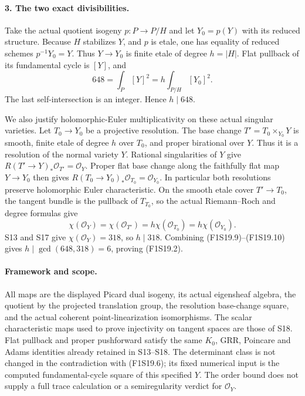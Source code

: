 \paragraph{3. The two exact divisibilities.}
Take the actual quotient isogeny $p:P\to P/H$ and let
$Y_0=p(Y)$ with its reduced structure. Because $H$ stabilizes
$Y$, and $p$ is etale, one has equality of reduced schemes
$p^{-1}Y_0=Y$. Thus $Y\to Y_0$ is finite etale of degree
$h=|H|$. Flat pullback of its fundamental cycle is $[Y]$, and
\[
          648=\int_P[Y]^2
                     =h\int_{P/H}[Y_0]^2.
 \tag{F1S19.9}
\]
The last self-intersection is an integer. Hence $h\mid648$.

We also justify holomorphic-Euler multiplicativity on these
actual singular varieties. Let $T_0\to Y_0$ be a projective
resolution. The base change $T'=T_0\times_{Y_0}Y$ is smooth,
finite etale of degree $h$ over $T_0$, and proper birational
over $Y$. Thus it is a resolution of the normal variety $Y$.
Rational singularities of $Y$ give
$R(T'\to Y)_*\mathcal O_{T'}=\mathcal O_Y$. Proper flat
base change along the faithfully flat map $Y\to Y_0$ then
gives $R(T_0\to Y_0)_*\mathcal O_{T_0}=\mathcal O_{Y_0}$.
In particular both resolutions preserve holomorphic Euler
characteristic. On the smooth etale cover $T'\to T_0$, the
tangent bundle is the pullback of $T_{T_0}$, so the actual
Riemann--Roch and degree formulas give
\[
 \chi(\mathcal O_Y)=\chi(\mathcal O_{T'})
     =h\chi(\mathcal O_{T_0})=h\chi(\mathcal O_{Y_0}).
 \tag{F1S19.10}
\]
S13 and S17 give $\chi(\mathcal O_Y)=318$, so $h\mid318$.
Combining (F1S19.9)--(F1S19.10) gives
$h\mid\gcd(648,318)=6$, proving (F1S19.2).

\paragraph{Framework and scope.}
All maps are the displayed Picard dual isogeny, its actual
eigensheaf algebra, the quotient by the projected translation
group, the resolution base-change square, and the actual
coherent point-linearization isomorphisms. The scalar
characteristic maps used to prove injectivity on tangent spaces
are those of S18. Flat pullback and proper pushforward satisfy
the same $K_0$, GRR, Poincare and Adams identities already
retained in S13--S18. The determinant class is not changed in
the contradiction with (F1S19.6); its fixed numerical input
is the computed fundamental-cycle square of this specified $Y$.
The order bound does not supply a full trace calculation or a
semiregularity verdict for $\mathcal O_Y$.
